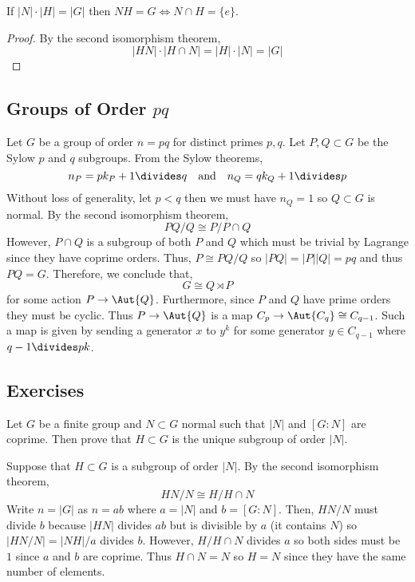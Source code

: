 \documentclass[12pt]{article}
\begin{document}
\begin{cor}
If $|N| \cdot |H| = |G|$ then $NH = G \iff N \cap H = \{ e \}$.
\end{cor}

\begin{proof}
By the second isomorphism theorem,
\[ |H N| \cdot |H \cap N| = |H| \cdot |N| = |G| \]
\end{proof}

\subsection{Groups of Order $pq$}

Let $G$ be a group of order $n = pq$ for distinct primes $p,q$. Let $P, Q \subset G$ be the Sylow $p$ and $q$ subgroups. From the Sylow theorems,
\[ n_P = p k_P + 1 \divides q \quad \text{and} \quad n_Q = q k_Q + 1 \divides p \]
Without loss of generality, let $p < q$ then we must have $n_Q = 1$ so $Q \subset G$ is normal.
By the second isomorphism theorem,
\[ PQ/Q \cong P / P \cap Q \]
However, $P \cap Q$ is a subgroup of both $P$ and $Q$ which must be trivial by Lagrange since they have coprime orders. Thus, $P \cong PQ / Q$ so $|PQ| = |P| |Q| = p q$ and thus $PQ = G$. Therefore, we conclude that,
\[ G \cong Q \rtimes P \]
for some action $P \to \Aut{Q}$. Furthermore, since $P$ and $Q$ have prime orders they must be cyclic. Thus $P \to \Aut{Q}$ is a map $C_p \to \Aut{C_q} \cong C_{q-1}$. Such a map is given by sending a generator $x$ to $y^k$ for some generator $y \in C_{q-1}$ where $q - 1 \divides p k$.

\subsection{Exercises}

\begin{exercise}
Let $G$ be a finite group and $N \subset G$ normal such that $|N|$ and $[G : N]$ are coprime. Then prove that $H \subset G$ is the unique subgroup of order $|N|$.
\end{exercise}

Suppose that $H \subset G$ is a subgroup of order $|N|$. By the second isomorphism theorem,
\[ HN/N \cong H/H \cap N \]
Write $n = |G|$ as $n = ab$ where $a = |N|$ and $b = [G : N]$. Then, $HN/N$ must divide $b$ because $|HN|$ divides $ab$ but is divisible by $a$ (it contains $N$) so $|HN/N| = |NH|/a$ divides $b$. However, $H / H \cap N$ divides $a$ so both sides must be $1$ since $a$ and $b$ are coprime. Thus $H \cap N = N$ so $H = N$ since they have the same number of elements.
\end{document}
